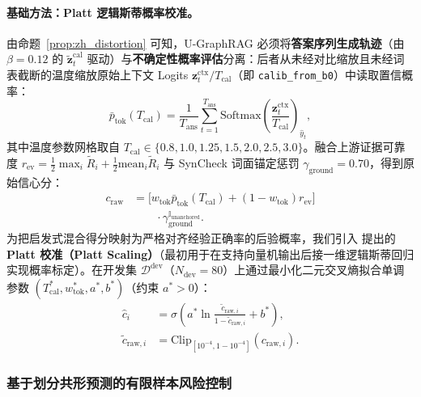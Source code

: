 \documentclass[11pt]{article}
\begin{document}
\paragraph{基础方法：Platt 逻辑斯蒂概率校准。}
由命题~\ref{prop:zh_distortion} 可知，U-GraphRAG 必须将\textbf{答案序列生成轨迹}（由 $\beta=0.12$ 的 $\tilde{\mathbf{z}}_t^{\text{cal}}$ 驱动）与\textbf{不确定性概率评估}分离：后者从未经对比缩放且未经词表截断的温度缩放原始上下文 Logits $\mathbf{z}_t^{\text{ctx}} / T_{\text{cal}}$（即 \texttt{calib\_from\_b0}）中读取置信概率：
\begin{equation}
\bar{p}_{\text{tok}}(T_{\text{cal}}) = \frac{1}{T_{\text{ans}}} \sum_{t=1}^{T_{\text{ans}}} \text{Softmax}\left(\frac{\mathbf{z}_t^{\text{ctx}}}{T_{\text{cal}}}\right)_{\hat{y}_t},
\label{eq:zh_m3_b0}
\end{equation}
其中温度参数网格取自 $T_{\text{cal}} \in \{0.8, 1.0, 1.25, 1.5, 2.0, 2.5, 3.0\}$。融合上游证据可靠度 $r_{\text{ev}} = \frac{1}{2}\max_i \tilde{R}_i + \frac{1}{2}\text{mean}_i \tilde{R}_i$ 与 SynCheck 词面锚定惩罚 $\gamma_{\text{ground}} = 0.70$，得到原始信心分：
\begin{align}
c_{\text{raw}} &= \bigl[ w_{\text{tok}}\bar{p}_{\text{tok}}(T_{\text{cal}}) + (1-w_{\text{tok}})r_{\text{ev}} \bigr] \nonumber \\
&\qquad \cdot \gamma_{\text{ground}}^{\mathbb{I}_{\text{unanchored}}}.
\label{eq:zh_m3_craw}
\end{align}
为把启发式混合得分映射为严格对齐经验正确率的后验概率，我们引入 \citet{platt1999probabilistic} 提出的 \textbf{Platt 校准（Platt Scaling）}（最初用于在支持向量机输出后接一维逻辑斯蒂回归实现概率标定）。在开发集 $\mathcal{D}^{\text{dev}}$（$N_{\text{dev}}=80$）上通过最小化二元交叉熵拟合单调参数 $(T_{\text{cal}}^*, w_{\text{tok}}^*, a^*, b^*)$（约束 $a^* > 0$）：
\begin{align}
\hat{c}_i &= \sigma\left( a^* \ln \frac{\tilde{c}_{\text{raw}, i}}{1 - \tilde{c}_{\text{raw}, i}} + b^* \right), \nonumber \\
\tilde{c}_{\text{raw}, i} &= \text{Clip}_{[10^{-4}, 1-10^{-4}]}(c_{\text{raw}, i}).
\label{eq:zh_m3_platt}
\end{align}

\subsubsection{基于划分共形预测的有限样本风险控制}
\end{document}
